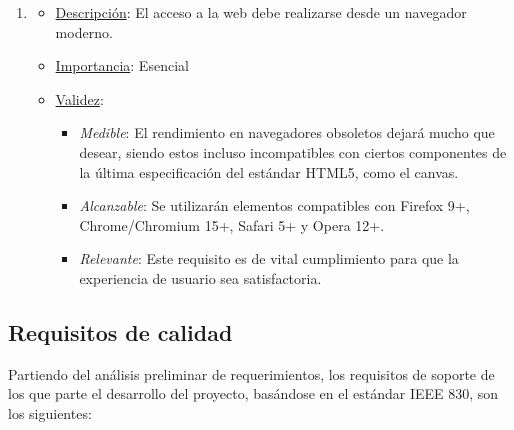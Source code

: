 \begin{enumerate}

\item %
  \begin{itemize}
  \item \underline{Descripción}: El acceso a la web debe realizarse desde un navegador moderno.
  \item \underline{Importancia}: Esencial
  \item \underline{Validez}:
    \begin{itemize}
    \item \textit{Medible}: El rendimiento en navegadores obsoletos dejará mucho que desear, siendo estos incluso incompatibles con ciertos componentes de la última especificación del estándar HTML5, como el canvas.
    \item \textit{Alcanzable}: Se utilizarán elementos compatibles con Firefox 9+, Chrome/Chromium 15+, Safari 5+ y Opera 12+.
    \item \textit{Relevante}: Este requisito es de vital cumplimiento para que la experiencia de usuario sea satisfactoria.
    \end{itemize}
  \end{itemize}

\end{enumerate}

\subsection{Requisitos de calidad}

Partiendo del análisis preliminar de requerimientos, los requisitos de soporte de los que parte el desarrollo del proyecto, basándose en el estándar IEEE 830, son los siguientes:
\renewcommand{\labelenumi}{\bf CA-\arabic{enumi}}


